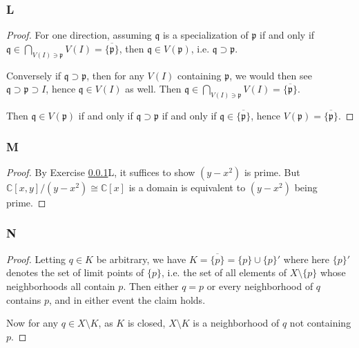\documentclass{article}
\newcommand{\C}{\mathbb{C}}
\newcommand{\frkp}{\mathfrak{p}}
\newcommand{\frkq}{\mathfrak{q}}
\begin{document}
\subsubsection{L}\label{3.6.L}
\begin{proof}
    For one direction, assuming $\frkq$ is a specialization of $\frkp$ if and only if $\frkq \in \bigcap_{V(I) \ni \frkp} V(I)=\overline{\{\frkp\}}$, then $\frkq \in V(\frkp)$, i.e. $\frkq \supset \frkp$.

    Conversely if $\frkq \supset \frkp$, then for any $V(I)$ containing $\frkp$, we would then see $\frkq \supset \frkp \supset I$, hence $\frkq \in V(I)$ as well. Then $\frkq \in \bigcap_{V(I) \ni \frkp} V(I) = \overline{\{\frkp\}}$.

    Then $\frkq \in V(\frkp)$ if and only if $\frkq \supset \frkp$ if and only if $\frkq \in \overline{\{\frkp\}}$, hence $V(\frkp)=\overline{\{\frkp\}}$.
    
\end{proof}
\subsubsection{M}\label{3.6.M}
\begin{proof}
    By Exercise \ref{3.6.L}L, it suffices to show $(y-x^2)$ is prime. But $\C[x,y]/(y-x^2)\cong \C[x]$ is a domain is equivalent to $(y-x^2)$ being prime.
\end{proof}
\subsubsection{N}\label{3.6.N}
\begin{proof}
    Letting $q\in K$ be arbitrary, we have $K=\overline{\{p\}}=\{p\} \cup \{p\}'$ where here $\{p\}'$ denotes the set of limit points of $\{p\}$, i.e. the set of all elements of $X\setminus \{p\}$ whose neighborhoods all contain $p$. Then either $q=p$ or every neighborhood of $q$ contains $p$, and in either event the claim holds.

    Now for any $q\in X\setminus K$, as $K$ is closed, $X\setminus K$ is a neighborhood of $q$ not containing $p$.
\end{proof}
\end{document}
